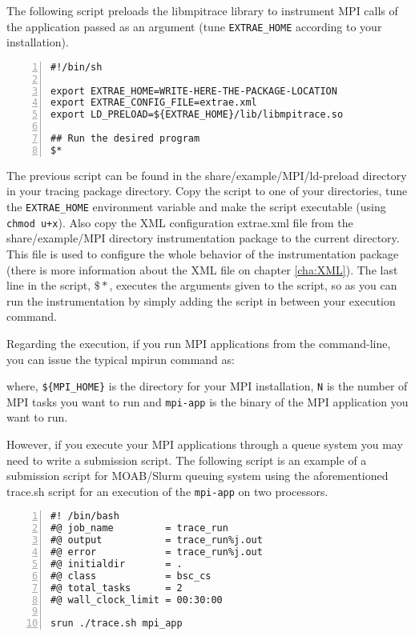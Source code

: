 The following script preloads the libmpitrace library to instrument MPI calls of the application passed as an argument (tune {\tt EXTRAE\_HOME} according to your installation).

\begin{Verbatim}[frame=single,numbers=left,labelposition=topline,label=trace.sh]
#!/bin/sh

export EXTRAE_HOME=WRITE-HERE-THE-PACKAGE-LOCATION
export EXTRAE_CONFIG_FILE=extrae.xml
export LD_PRELOAD=${EXTRAE_HOME}/lib/libmpitrace.so

## Run the desired program
$*
\end{Verbatim}

The previous script can be found in the share/example/MPI/ld-preload directory in your tracing package directory. Copy the script to one of your directories, tune the {\tt EXTRAE\_HOME} environment variable and make the script executable (using {\tt chmod u+x}). Also copy the XML configuration extrae.xml file from the share/example/MPI directory instrumentation package to the current directory. This file is used to configure the whole behavior of the instrumentation package (there is more information about the XML file on chapter \ref{cha:XML}). The last line in the script, $\$\ast$, executes the arguments given to the script, so as you can run the instrumentation by simply adding the script in between your execution command.

Regarding the execution, if you run MPI applications from the command-line, you can issue the typical mpirun command as:


where, {\tt \$\{MPI\_HOME\}} is the directory for your MPI installation, {\tt N} is the number of MPI tasks you want to run and {\tt mpi-app} is the binary of the MPI application you want to run.

However, if you execute your MPI applications through a queue system you may need to write a submission script. The following script is an example of a submission script for MOAB/Slurm queuing system using the aforementioned trace.sh script for an execution of the {\tt mpi-app} on two processors.

\begin{Verbatim}[frame=single,numbers=left,labelposition=topline,label=slurm-trace.sh]
#! /bin/bash
#@ job_name         = trace_run
#@ output           = trace_run%j.out
#@ error            = trace_run%j.out
#@ initialdir       = .
#@ class            = bsc_cs
#@ total_tasks      = 2
#@ wall_clock_limit = 00:30:00

srun ./trace.sh mpi_app 
\end{Verbatim}

